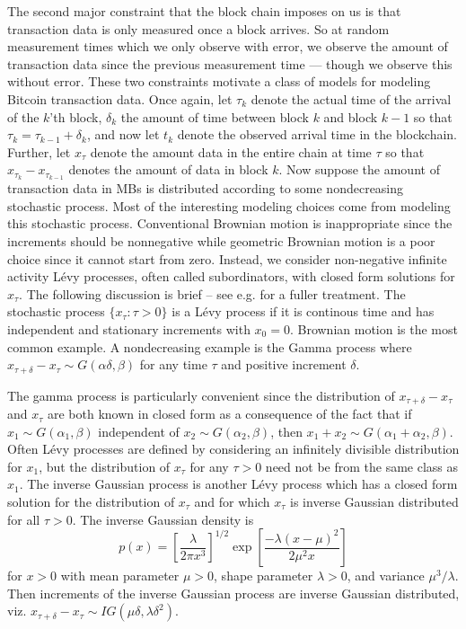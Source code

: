 \documentclass{article}
\begin{document}
The second major constraint that the block chain imposes on us is that transaction data is only measured once a block arrives. So at random measurement times which we only observe with error, we observe the amount of transaction data since the previous measurement time --- though we observe this without error. These two constraints motivate a class of models for modeling Bitcoin transaction data. Once again, let $\tau_k$ denote the actual time of the arrival of the $k$'th block, $\delta_k$ the amount of time between block $k$ and block $k-1$ so that $\tau_{k}=\tau_{k-1} + \delta_k$, and now let $t_k$ denote the observed arrival time in the blockchain. Further, let $x_\tau$ denote the amount data in the entire chain at time $\tau$ so that $x_{\tau_{k}} - x_{\tau_{k-1}}$ denotes the amount of data in block $k$. Now suppose the amount of transaction data in MBs is distributed according to some nondecreasing stochastic process. Most of the interesting modeling choices come from modeling this stochastic process. Conventional Brownian motion is inappropriate since the increments should be nonnegative while geometric Brownian motion is a poor choice since it cannot start from zero. Instead, we consider non-negative infinite activity L\'{e}vy processes, often called subordinators, with closed form solutions for $x_{\tau}$. The following discussion is brief -- see e.g. \citet{barndorff2012basics} for a fuller treatment. The stochastic process $\{x_{\tau}:\tau>0\}$ is a L\'{e}vy process if it is continous time and has independent and stationary increments with $x_0=0$. Brownian motion is the most common example. A nondecreasing example is the Gamma process where $x_{\tau + \delta} - x_{\tau} \sim G(\alpha \delta, \beta)$ for any time $\tau$ and positive increment $\delta$. 

The gamma process is particularly convenient since the distribution of $x_{\tau+\delta} - x_\tau$ and $x_\tau$ are both known in closed form as a consequence of the fact that if $x_1\sim G(\alpha_1,\beta)$ independent of $x_2\sim G(\alpha_2,\beta)$, then $x_1+x_2 \sim G(\alpha_1 + \alpha_2, \beta)$. Often L\'{e}vy processes are defined by considering an infinitely divisible distribution for $x_1$, but the distribution of $x_{\tau}$ for any $\tau>0$ need not be from the same class as $x_1$. The inverse Gaussian process is another L\'{e}vy process which has a closed form solution for the distribution of $x_\tau$ and for which $x_\tau$ is inverse Gaussian distributed for all $\tau>0$. The inverse Gaussian density is
\[
p(x) = \left[\frac{\lambda}{2\pi x^3}\right]^{1/2}\exp\left[\frac{-\lambda(x - \mu)^2}{2\mu^2x}\right]
\]
for $x>0$ with mean parameter $\mu>0$, shape parameter $\lambda>0$, and variance $\mu^3/\lambda$. Then increments of the inverse Gaussian process are inverse Gaussian distributed, viz. $x_{\tau + \delta} - x_\tau \sim IG(\mu\delta,\lambda\delta^2)$.
\end{document}
